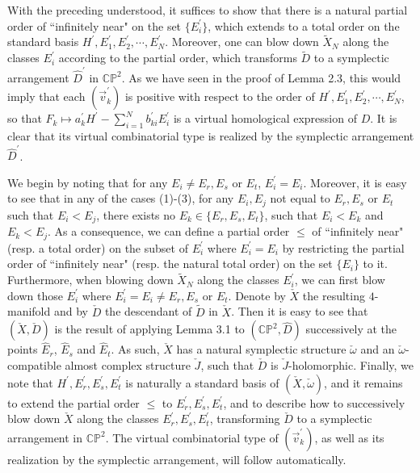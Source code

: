 \documentclass[11pt]{amsart}
\theoremstyle{plain}
\numberwithin{theorem}{section}
\theoremstyle{definition}
\newcommand{\C}{{\mathbb C}}
\renewcommand{\P}{{\mathbb P}}
\begin{document}
With the preceding understood, it suffices to show that there is a natural partial order of ``infinitely near" 
on the set $\{E_i^\prime\}$, which extends to a total order on the standard basis $H^\prime,E_1^\prime,E_2^\prime,\cdots,E_N^\prime$. Moreover, one can blow down $\tilde{X}_N$ along the classes $E_i^\prime$ according to the partial order, which transforms $\tilde{D}$ to a symplectic arrangement $\hat{D}^\prime$ in $\C\P^2$. As we have seen in the proof of Lemma 2.3, this would imply that each $(\vec{v}_k^\prime)$ is positive with respect to the order of $H^\prime,E_1^\prime,E_2^\prime,\cdots,E_N^\prime$, so that $F_k\mapsto a_k^\prime H^\prime-\sum_{i=1}^N b_{ki}^\prime E_i^\prime$ is a virtual homological expression of $D$. It is clear that its virtual combinatorial type is realized by the symplectic arrangement $\hat{D}^\prime$.

We begin by noting that for any $E_i\neq E_r,E_s$ or $E_t$, $E_i^\prime=E_i$. Moreover, it is easy to see that in any of the cases (1)-(3), for any $E_i,E_j$ not equal to $E_r,E_s$ or $E_t$ such that $E_i<E_j$,
there exists no $E_k\in \{E_r,E_s,E_t\}$, such that $E_i<E_k$ and $E_k<E_j$. As a consequence,
we can define a partial order $\leq$ of ``infinitely near" (resp. a total order) on the subset of $E_i^\prime$ where
$E_i^\prime=E_i$ by restricting the partial order of ``infinitely near" (resp. the natural total order) on the set $\{E_i\}$ to it. Furthermore, when blowing down $\tilde{X}_N$ along the classes $E_i^\prime$, we can first blow
down those $E_i^\prime$ where $E_i^\prime=E_i\neq E_r,E_s$ or $E_t$. Denote by $\check{X}$
the resulting $4$-manifold and by $\check{D}$ the descendant of $\tilde{D}$ in $\check{X}$. 
Then it is easy to see that $(\check{X},\check{D})$ is the result of applying Lemma 3.1 to
$(\C\P^2, \hat{D})$ successively at the points $\hat{E}_r$, $\hat{E}_s$ and $\hat{E}_t$. As such, 
$\check{X}$ has a natural symplectic structure $\check{\omega}$ and an $\check{\omega}$-compatible almost complex structure $\check{J}$, such that $\check{D}$ is $\check{J}$-holomorphic. 
Finally, we note that $H^\prime,E_r^\prime,E_s^\prime,E_t^\prime$ is naturally a standard basis of
$(\check{X},\check{\omega})$, and it remains to extend the partial order $\leq$ to 
$E_r^\prime,E_s^\prime,E_t^\prime$, and to describe how to successively blow down $\check{X}$
along the classes $E_r^\prime,E_s^\prime,E_t^\prime$, transforming $\check{D}$ to a symplectic 
arrangement in $\C\P^2$. The virtual combinatorial type of $(\vec{v}_k^\prime)$, as well as its realization by the symplectic arrangement, will follow automatically. 
\end{document}
